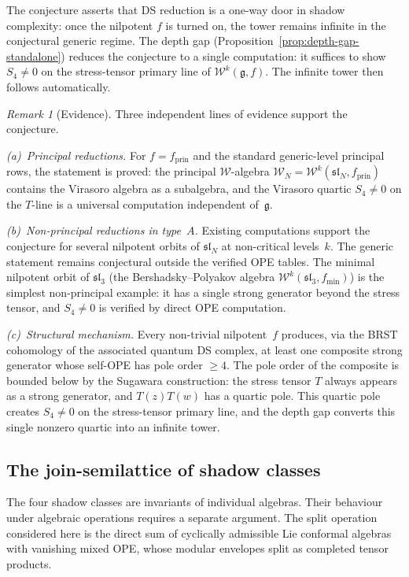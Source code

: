 \documentclass[11pt]{article}
\theoremstyle{plain}
\theoremstyle{definition}
\theoremstyle{remark}
\newtheorem{remark}[theorem]{Remark}
\providecommand{\fg}{\mathfrak{g}}
\providecommand{\cW}{\mathcal{W}}
\begin{document}
The conjecture asserts that DS reduction is a one-way door in
shadow complexity: once the nilpotent $f$ is turned on, the
tower remains infinite in the conjectural generic regime. The depth gap
(Proposition~\ref{prop:depth-gap-standalone}) reduces the
conjecture to a single computation: it suffices to show
$S_4 \neq 0$ on the stress-tensor primary line of
$\cW^k(\fg, f)$. The infinite tower then follows
automatically.

\begin{remark}[Evidence]\label{rem:ds-escalation-evidence}
Three independent lines of evidence support the conjecture.

\emph{(a)~Principal reductions.} For $f = f_{\mathrm{prin}}$
and the standard generic-level principal rows, the statement is proved: the principal
$\cW$-algebra $\cW_N = \cW^k(\mathfrak{sl}_N,
f_{\mathrm{prin}})$ contains the Virasoro algebra as a
subalgebra, and the Virasoro quartic $S_4 \neq 0$ on the
$T$-line is a universal computation independent of~$\fg$.

\emph{(b)~Non-principal reductions in type~$A$.} Existing
computations support the conjecture for several nilpotent orbits of
$\mathfrak{sl}_N$ at non-critical levels~$k$. The generic statement
remains conjectural outside the verified OPE tables.
The minimal nilpotent orbit of $\mathfrak{sl}_3$ (the
Bershadsky--Polyakov algebra $\cW^k(\mathfrak{sl}_3, f_{\min})$)
is the simplest non-principal example: it has a single
strong generator beyond the stress tensor, and $S_4 \neq 0$ is
verified by direct OPE computation.

\emph{(c)~Structural mechanism.} Every non-trivial
nilpotent~$f$ produces, via the BRST cohomology of the
associated quantum DS complex, at least one composite strong
generator whose self-OPE has pole order $\geq 4$. The pole
order of the composite is bounded below by the Sugawara
construction: the stress tensor $T$ always appears as a strong
generator, and $T(z)T(w)$ has a quartic pole. This quartic pole
creates $S_4 \neq 0$ on the stress-tensor primary line, and the
depth gap converts this single nonzero quartic into an infinite
tower.
\end{remark}


\subsection{The join-semilattice of shadow classes}
\label{ssec:shadow-semilattice}

The four shadow classes are invariants of individual algebras.
Their behaviour under algebraic operations requires a separate
argument. The split operation considered here is the direct sum of
cyclically admissible Lie conformal algebras with vanishing mixed
OPE, whose modular envelopes split as completed tensor products.
\end{document}
